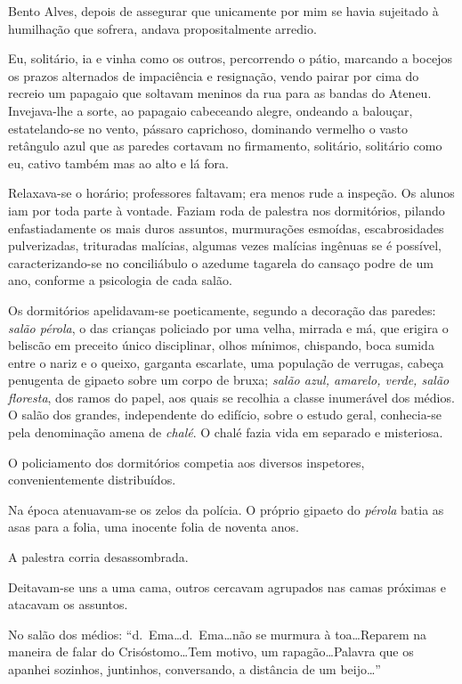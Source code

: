 Bento Alves, depois de assegurar que unicamente por mim se havia
sujeitado à humilhação que sofrera, andava propositalmente arredio. 

Eu, solitário, ia e vinha como os outros, percorrendo o pátio, marcando a
bocejos os prazos alternados de impaciência e resignação, vendo pairar
por cima do recreio um papagaio que soltavam meninos da rua para as
bandas do Ateneu. Invejava{}-lhe a sorte, ao papagaio cabeceando
alegre, ondeando a balouçar, estatelando{}-se no vento, pássaro
caprichoso, dominando vermelho o vasto retângulo azul que as paredes
cortavam no firmamento, solitário, solitário como eu, cativo também mas
ao alto e lá fora. 

Relaxava{}-se o horário; professores faltavam; era
menos rude a inspeção. Os alunos iam por toda parte à vontade. Faziam
roda de palestra nos dormitórios, pilando enfastiadamente os mais duros
assuntos, murmurações esmoídas, escabrosidades pulverizadas, trituradas
malícias, algumas vezes malícias ingênuas se é possível, caracterizando{}-se no conciliábulo o
azedume tagarela do cansaço podre de um ano, conforme a psicologia de
cada salão. 

Os dormitórios apelidavam{}-se poeticamente, segundo a
decoração das paredes: \textit{salão pérola}, o das crianças policiado por uma
velha, mirrada e má, que erigira o beliscão em preceito único
disciplinar, olhos mínimos, chispando, boca sumida entre o nariz e o
queixo, garganta escarlate, uma população de verrugas, cabeça penugenta
de gipaeto sobre um corpo de bruxa; \textit{salão azul, amarelo, verde, salão
floresta}, dos ramos do papel, aos quais se recolhia a classe inumerável
dos médios. O salão dos grandes, independente do edifício, sobre o
estudo geral, conhecia{}-se pela denominação amena de \textit{chalé}. O chalé
fazia vida em separado e misteriosa. 

O policiamento dos dormitórios
competia aos diversos inspetores, convenientemente distribuídos. 

Na época atenuavam{}-se os zelos da polícia. O próprio gipaeto do \textit{pérola}
batia as asas para a folia, uma inocente folia de noventa anos. 

A palestra corria desassombrada. 

Deitavam{}-se uns a uma cama, outros
cercavam agrupados nas camas próximas e atacavam os assuntos. 

No salão dos médios: ``d.~Ema\ldots d.~Ema\ldots não se murmura à toa\ldots Reparem na
maneira de falar do Crisóstomo\ldots Tem motivo, um rapagão\ldots Palavra que
os apanhei sozinhos, juntinhos, conversando, a distância de um beijo\ldots''

